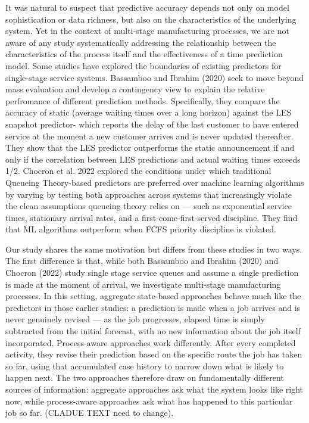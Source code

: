 \documentclass[
]{ceurart}
\begin{document}
It was natural to suspect that predictive accuracy depends not only on model sophistication or data richness, but also on the characteristics of the underlying system. 
Yet in the context of multi-stage manufacturing processes, we are not aware of any study systematically addressing the relationship between the characteristics of the process itself and the effectiveness of a time prediction model. 
Some studies have explored the boundaries of existing predictors for single-stage service systems. Bassamboo and Ibrahim (2020) seek to move beyond mass evaluation and develop a 
contingency view to explain the relative perfromance of different prediction methods. Specifically, they compare the accuracy of static (average waiting times over a long horizon) against the LES snapshot predictor- which reports 
the delay of the last customer to have entered service at the moment a new customer arrives and is never updated thereafter. 
They show that the LES predictor outperforms the static announcement if and only if the correlation between LES predictions and actual waiting times exceeds 1/2. 
Chocron et al. 2022 explored the conditions under which traditional Queueing Theory-based predictors are preferred over machine learning algorithms by varying by testing both approaches across systems that 
increasingly violate the clean assumptions queueing theory relies on — such as exponential service times, stationary arrival rates, and a first-come-first-served discipline. They find that ML algorithms outperform when
FCFS priority discipline is violated.

Our study shares the same motivation but differs from these studies in two ways. The first difference is that, while both Bassamboo and Ibrahim (2020) and Chocron (2022) study single stage service queues and assume a single
prediction is made at the moment of arrival, we investigate multi-stage manufacturing processes. In this setting, aggregate state-based approaches behave much like the predictors in those earlier studies: 
a prediction is made when a job arrives and is never genuinely revised — as the job progresses, elapsed time is simply subtracted from the initial forecast, with no new information about the job itself incorporated. 
Process-aware approaches work differently. After every completed activity, they revise their prediction based on the specific route the job has taken so far, using that accumulated case history to narrow down what is 
likely to happen next. The two approaches therefore draw on fundamentally different sources of information: aggregate approaches ask what the system looks like right now, while process-aware approaches ask what has 
happened to this particular job so far. (CLADUE TEXT need to change).
\end{document}
